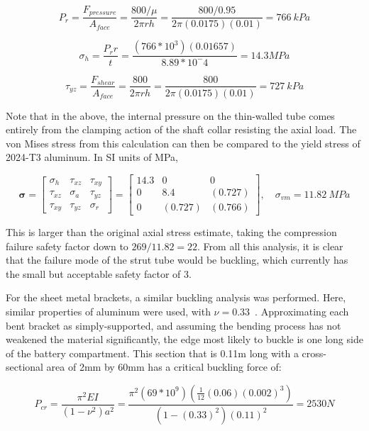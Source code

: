 \documentclass[12pt]{report}
\begin{document}
\[
P_r = \frac{F_{pressure}}{A_{face}} = \frac{ 800/ \mu }{2 \pi r h} = \frac{ 800/ 0.95 }{2 \pi (0.0175) (0.01)} = 766 \ kPa
\]

\[
\sigma_h = \frac{P_r r}{t} = \frac{(766 * 10^3)(0.01657)}{8.89*10^-4} = 14.3 MPa
\]

\[
\tau_{yz} = \frac{F_{shear}}{A_{face}} = \frac{ 800 }{2 \pi r h} = \frac{ 800}{2 \pi (0.0175) (0.01)} = 727 \ kPa
\]

Note that in the above, the internal pressure on the thin-walled tube comes entirely from the clamping action of the shaft collar resisting the axial load.
The von Mises stress from this calculation can then be compared to the yield stress of 2024-T3 aluminum. In SI units of MPa,

\[
\boldsymbol{\sigma} = \left[ \begin{array}{ccc}
    \sigma_h & \tau_{xz} & \tau_{xy} \\
    \tau_{xz} & \sigma_a & \tau_{yz} \\
    \tau_{xy} & \tau_{yz} & \sigma_r
\end{array} \right]
=
\left[ \begin{array}{ccc}
    14.3 & 0 & 0 \\
    0 & 8.4 & (0.727) \\
    0 & (0.727) & (0.766)
\end{array} \right],
\quad
\sigma_{vm} = 11.82 \ MPa
\]

This is larger than the original axial stress estimate, taking the compression failure safety factor down to $269/11.82 = 22$.
From all this analysis, it is clear that the failure mode of the strut tube would be buckling, which currently has the small but acceptable safety factor of 3.

For the sheet metal brackets, a similar buckling analysis was performed. 
Here, similar properties of aluminum were used, with $\nu = 0.33$~\cite{Aluminum2024_2014}.
Approximating each bent bracket as simply-supported, and assuming the bending process has not weakened the material significantly, the edge most likely to buckle is one long side of the battery compartment.
This section that is 0.11m long with a cross-sectional area of 2mm by 60mm has a critical buckling force \cite{rees2009optimal} of:

\[
P_{cr} = \frac{\pi^2 E I}{(1-\nu^2)a^2} = \frac{ \pi^2 (69*10^9)(\frac{1}{12} (0.06)(0.002)^3)}{(1-(0.33)^2)(0.11)^2} = 2530 N
\]
\end{document}
